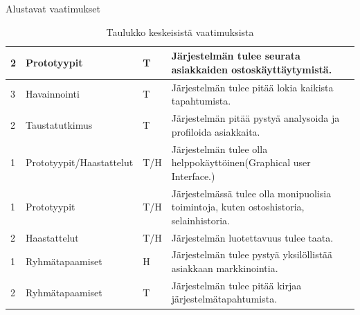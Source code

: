 \documentclass{beamer}
\begin{document}
\begin{frame}{Alustavat vaatimukset}
\begin{table}[]
{\begin{tabular}{llll}
    \multicolumn{1}{|l|}{2}                                            & \multicolumn{1}{l|}{Prototyypit}                                      & \multicolumn{1}{l|}{T}                                      & \multicolumn{1}{l|}{Järjestelmän tulee seurata asiakkaiden ostoskäyttäytymistä.}                              \\ \hline
    \multicolumn{1}{|l|}{3}                                            & \multicolumn{1}{l|}{Havainnointi}                                      & \multicolumn{1}{l|}{T}                                      & \multicolumn{1}{l|}{Järjestelmän tulee pitää lokia kaikista tapahtumista.}                                   \\ \hline
    \multicolumn{1}{|l|}{2}                                            & \multicolumn{1}{l|}{Taustatutkimus}                                      & \multicolumn{1}{l|}{T}                                      & \multicolumn{1}{l|}{Järjestelmän pitää pystyä analysoida ja profiloida asiakkaita.}                         \\ \hline
    \multicolumn{1}{|l|}{1}                                            & \multicolumn{1}{l|}{Prototyypit/Haastattelut}                                      & \multicolumn{1}{l|}{T/H}                                    & \multicolumn{1}{l|}{Järjestelmän tulee olla helppokäyttöinen(Graphical user Interface.)}                    \\ \hline
    \multicolumn{1}{|l|}{1}                                            & \multicolumn{1}{l|}{Prototyypit}                                      & \multicolumn{1}{l|}{T/H}                                    & \multicolumn{1}{l|}{Järjestelmässä tulee olla monipuolisia toimintoja, kuten ostoshistoria, selainhistoria.}\\ \hline
    \multicolumn{1}{|l|}{2}                                            & \multicolumn{1}{l|}{Haastattelut}                                      & \multicolumn{1}{l|}{T/H}                                    & \multicolumn{1}{l|}{Järjestelmän luotettavuus tulee taata.}                                                 \\ \hline
    \multicolumn{1}{|l|}{1}                                            & \multicolumn{1}{l|}{Ryhmätapaamiset}                                      & \multicolumn{1}{l|}{H}                                    & \multicolumn{1}{l|}{Järjestelmän tulee pystyä yksilöllistää asiakkaan markkinointia.}                       \\ \hline
    \multicolumn{1}{|l|}{2}                                            & \multicolumn{1}{l|}{Ryhmätapaamiset}                                      & \multicolumn{1}{l|}{T}                                    & \multicolumn{1}{l|}{Järjestelmän tulee pitää kirjaa järjestelmätapahtumista.}                               \\ \hline
   

    \end{tabular}
}
    \caption{Taulukko keskeisistä vaatimuksista}
    \label{tab:vaatimukset}
    \end{table}	
\end{frame}
\end{document}
